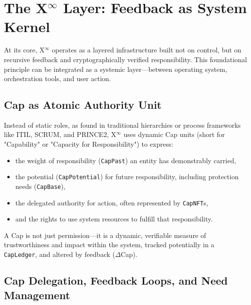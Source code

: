 \documentclass[12pt, a4paper]{scrartcl}
\newcommand{\Xinf}{X$^\infty$}                        %
\newcommand{\DeltaCap}{$\Delta$Cap}                    %
\newcommand{\CapPotential}{\texttt{CapPotential}}    %
\newcommand{\CapPast}{\texttt{CapPast}}              %
\newcommand{\CapBase}{\texttt{CapBase}}              %
\newcommand{\CapLedger}{\texttt{CapLedger}}          %
\newcommand{\CapNFT}{\texttt{CapNFT}}
\begin{document}
\section{The \Xinf{} Layer: Feedback as System Kernel}

At its core, \Xinf{} operates as a layered infrastructure built not on control, but on recursive feedback and cryptographically verified responsibility. This foundational principle can be integrated as a systemic layer—between operating system, orchestration tools, and user action.

\subsection{Cap as Atomic Authority Unit}

Instead of static roles, as found in traditional hierarchies or process frameworks like ITIL, SCRUM, and PRINCE2, \Xinf{} uses dynamic Cap units (short for "Capability" or "Capacity for Responsibility") to express:
\begin{itemize}
    \item the weight of responsibility (\CapPast{}) an entity has demonstrably carried,
    \item the potential (\CapPotential{}) for future responsibility, including protection needs (\CapBase{}),
    \item the delegated authority for action, often represented by \CapNFT{}s,
    \item and the rights to use system resources to fulfill that responsibility.
\end{itemize}
A Cap is not just permission—it is a dynamic, verifiable measure of trustworthiness and impact within the system, tracked potentially in a \CapLedger{}, and altered by feedback (\DeltaCap{}).

\subsection{Cap Delegation, Feedback Loops, and Need Management}
\end{document}
